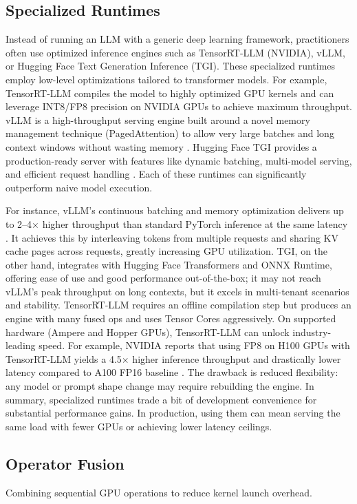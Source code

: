 \subsection{Specialized Runtimes}
Instead of running an LLM with a generic deep learning framework, practitioners often use optimized inference engines such as TensorRT-LLM (NVIDIA), vLLM, or Hugging Face Text Generation Inference (TGI). These specialized runtimes employ low-level optimizations tailored to transformer models. For example, TensorRT-LLM compiles the model to highly optimized GPU kernels and can leverage INT8/FP8 precision on NVIDIA GPUs to achieve maximum throughput. vLLM is a high-throughput serving engine built around a novel memory management technique (PagedAttention) to allow very large batches and long context windows without wasting memory \cite{Kwon2023vLLM}. Hugging Face TGI provides a production-ready server with features like dynamic batching, multi-model serving, and efficient request handling \cite{tgi_docs}. Each of these runtimes can significantly outperform naive model execution.

For instance, vLLM’s continuous batching and memory optimization delivers up to 2--4$\times$ higher throughput than standard PyTorch inference at the same latency \cite{Kwon2023vLLM}. It achieves this by interleaving tokens from multiple requests and sharing KV cache pages across requests, greatly increasing GPU utilization. TGI, on the other hand, integrates with Hugging Face Transformers and ONNX Runtime, offering ease of use and good performance out-of-the-box; it may not reach vLLM’s peak throughput on long contexts, but it excels in multi-tenant scenarios and stability. TensorRT-LLM requires an offline compilation step but produces an engine with many fused ops and uses Tensor Cores aggressively. On supported hardware (Ampere and Hopper GPUs), TensorRT-LLM can unlock industry-leading speed. For example, NVIDIA reports that using FP8 on H100 GPUs with TensorRT-LLM yields a 4.5$\times$ higher inference throughput and drastically lower latency compared to A100 FP16 baseline \cite{NVIDIA2023Hopper}. The drawback is reduced flexibility: any model or prompt shape change may require rebuilding the engine. In summary, specialized runtimes trade a bit of development convenience for substantial performance gains. In production, using them can mean serving the same load with fewer GPUs or achieving lower latency ceilings.

\subsection{Operator Fusion}
Combining sequential GPU operations to reduce kernel launch overhead.


